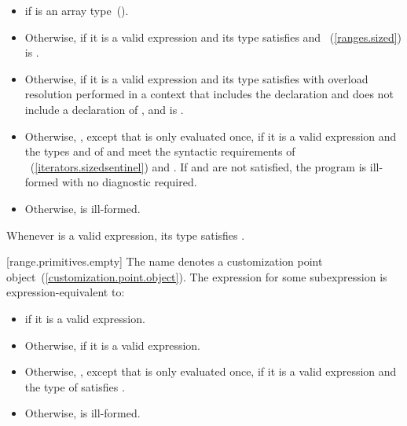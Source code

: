 \begin{itemize}
\item
   if  is an array
  type~().

\item
  Otherwise,  if it is a valid expression and its type 
  satisfies  and
  ~(\ref{ranges.sized}) is
  .

\item
  Otherwise,  if it is a valid expression and its type 
  satisfies  with overload resolution
  performed in a context that includes the declaration
   and does not include
  a declaration of , and
   is .

\item
  Otherwise,
  , except that 
  is only evaluated once, if it is a valid expression and the types  and  of
   and  meet the
  syntactic requirements of
  ~(\ref{iterators.sizedsentinel}) and
  . If  and
   are not satisfied, the program is ill-formed with no
  diagnostic required.

\item
  Otherwise,  is ill-formed.
\end{itemize}

\pnum
\enternote Whenever  is a valid expression, its
type satisfies . \exitnote

[range.primitives.empty]{}
\pnum
The name  denotes a customization point
object~(\ref{customization.point.object}). The expression
 for some subexpression  is
expression-equivalent to:

\begin{itemize}
\item
   if it is a valid expression.

\item
  Otherwise,  if it is a valid expression.

\item
  Otherwise, ,
  except that  is only evaluated once, if it is a valid expression and the type of
   satisfies .

\item
  Otherwise,  is ill-formed.
\end{itemize}


